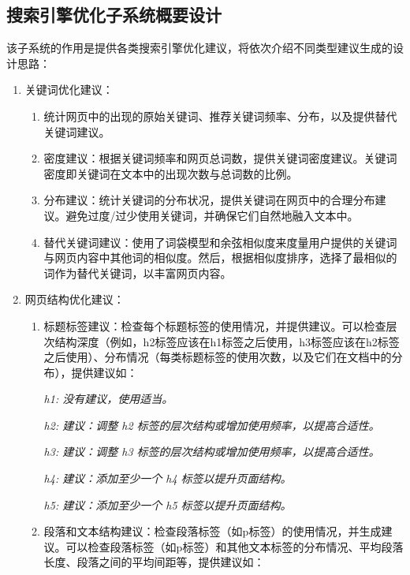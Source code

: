 \documentclass[11pt, a4paper, oneside]{ctexbook}
\begin{document}
\subsection{搜索引擎优化子系统概要设计}
该子系统的作用是提供各类搜索引擎优化建议，将依次介绍不同类型建议生成的设计思路：
\begin{enumerate}
    \item 关键词优化建议：
          \begin{enumerate}
              \item 统计网页中的出现的原始关键词、推荐关键词频率、分布，以及提供替代关键词建议。
              \item 密度建议：根据关键词频率和网页总词数，提供关键词密度建议。关键词密度即关键词在文本中的出现次数与总词数的比例。
              \item 分布建议：统计关键词的分布状况，提供关键词在网页中的合理分布建议。避免过度/过少使用关键词，并确保它们自然地融入文本中。
              \item 替代关键词建议：使用了词袋模型和余弦相似度来度量用户提供的关键词与网页内容中其他词的相似度。然后，根据相似度排序，选择了最相似的词作为替代关键词，以丰富网页内容。
          \end{enumerate}
    \item 网页结构优化建议：
          \begin{enumerate}
              \item 标题标签建议：检查每个标题标签的使用情况，并提供建议。可以检查层次结构深度（例如，h2标签应该在h1标签之后使用，h3标签应该在h2标签之后使用）、分布情况（每类标题标签的使用次数，以及它们在文档中的分布），提供建议如：

                    \textit{h1: 没有建议，使用适当。}\vspace{-0.5em}

                    \textit{h2: 建议：调整 h2 标签的层次结构或增加使用频率，以提高合适性。}\vspace{-0.5em}

                    \textit{h3: 建议：调整 h3 标签的层次结构或增加使用频率，以提高合适性。}\vspace{-0.5em}

                    \textit{h4: 建议：添加至少一个 h4 标签以提升页面结构。}\vspace{-0.5em}

                    \textit{h5: 建议：添加至少一个 h5 标签以提升页面结构。}

              \item 段落和文本结构建议：检查段落标签（如p标签）的使用情况，并生成建议。可以检查段落标签（如p标签）和其他文本标签的分布情况、平均段落长度、段落之间的平均间距等，提供建议如：


\end{enumerate}
\end{enumerate}
\end{document}
